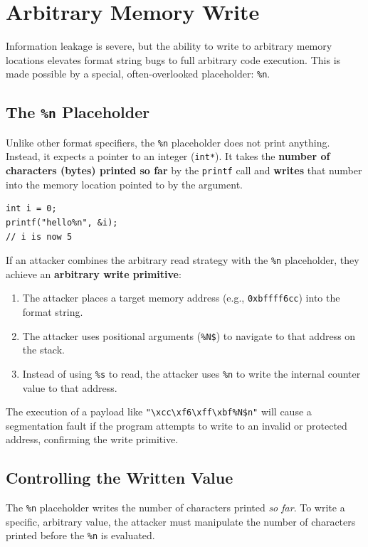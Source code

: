 \section{Arbitrary Memory Write}

Information leakage is severe, but the ability to write to arbitrary memory locations elevates format string bugs to full arbitrary code execution. This is made possible by a special, often-overlooked placeholder: \texttt{\%n}.

\subsection{The \texttt{\%n} Placeholder}
Unlike other format specifiers, the \texttt{\%n} placeholder does not print anything. Instead, it expects a pointer to an integer (\texttt{int*}). It takes the \textbf{number of characters (bytes) printed so far} by the \texttt{printf} call and \textbf{writes} that number into the memory location pointed to by the argument.

\begin{verbatim}
int i = 0;
printf("hello%n", &i);
// i is now 5
\end{verbatim}

If an attacker combines the arbitrary read strategy with the \texttt{\%n} placeholder, they achieve an \textbf{arbitrary write primitive}:
\begin{enumerate}
    \item The attacker places a target memory address (e.g., \texttt{0xbffff6cc}) into the format string.
    \item The attacker uses positional arguments (\texttt{\%N\$}) to navigate to that address on the stack.
    \item Instead of using \texttt{\%s} to read, the attacker uses \texttt{\%n} to write the internal counter value to that address.
\end{enumerate}

The execution of a payload like \texttt{"\textbackslash{}xcc\textbackslash{}xf6\textbackslash{}xff\textbackslash{}xbf\%N\$n"} will cause a segmentation fault if the program attempts to write to an invalid or protected address, confirming the write primitive.

\subsection{Controlling the Written Value}
The \texttt{\%n} placeholder writes the number of characters printed \emph{so far}. To write a specific, arbitrary value, the attacker must manipulate the number of characters printed before the \texttt{\%n} is evaluated.

